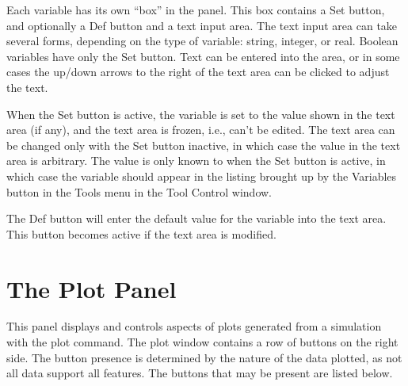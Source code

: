 Each variable has its own ``box'' in the panel.  This box contains a
{\cb Set} button, and optionally a {\cb Def} button and a text input
area.  The text input area can take several forms, depending on the
type of variable:  string, integer, or real.  Boolean variables have
only the {\cb Set} button.  Text can be entered into the area, or in
some cases the up/down arrows to the right of the text area can be
clicked to adjust the text.

When the {\cb Set} button is active, the variable is set to the value
shown in the text area (if any), and the text area is frozen, i.e.,
can't be edited.  The text area can be changed only with the {\cb Set}
button inactive, in which case the value in the text area is
arbitrary.  The value is only known to {\WRspice} when the {\cb Set}
button is active, in which case the variable should appear in the
listing brought up by the {\cb Variables} button in the {\cb Tools}
menu in the {\cb Tool Control} window.

The {\cb Def} button will enter the default value for the variable
into the text area.  This button becomes active if the text area is
modified.


\section{The Plot Panel}
\label{plotpanel}


This panel displays and controls aspects of plots generated from a
simulation with the {\cb plot} command.  The plot window contains a
row of buttons on the right side.  The button presence is determined
by the nature of the data plotted, as not all data support all
features.  The buttons that may be present are listed below.

